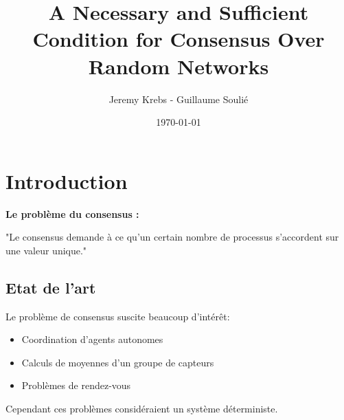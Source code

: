 \documentclass{beamer}
\title{A Necessary and Sufficient Condition for
Consensus Over Random Networks}
\author{Jeremy Krebs - Guillaume Soulié}
\institute{Université Paris Saclay}
\date{\today}
\begin{document}
\begin{frame}
\titlepage
\end{frame}


\section{Introduction}
\begin{frame}
	\textbf{Le problème du consensus :}

	"Le consensus demande à ce qu'un certain nombre de processus s'accordent sur une valeur unique."
	\begin{center}
	\end{center}
\end{frame}


\begin{frame}
	\tableofcontents
\end{frame}

\subsection{Etat de l'art}
\begin{frame}
		Le problème de consensus suscite beaucoup d'intérêt:
		 \begin{itemize}
		 	\item Coordination d'agents autonomes
		 	\pause
		 	\item Calculs de moyennes d'un groupe de capteurs
		 	\pause
		 	\item Problèmes de rendez-vous
		 \end{itemize}
		 
		 \pause
		 
		 Cependant ces problèmes considéraient un système déterministe.
\end{frame}		
\end{document}
